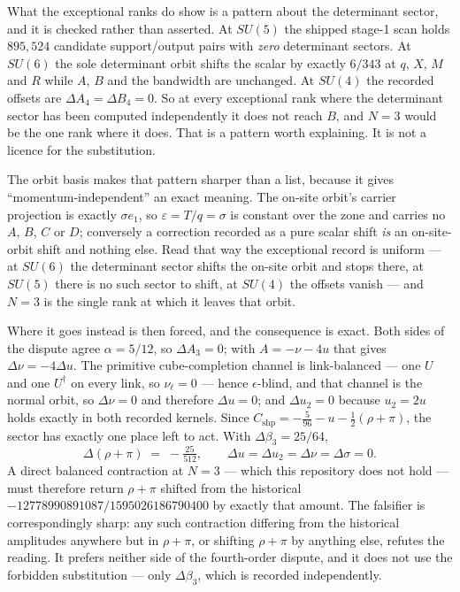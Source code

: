 \documentclass[11pt]{article}
\theoremstyle{plain}
\theoremstyle{definition}
\theoremstyle{remark}
\newcommand{\chk}[1]{}
\begin{document}
What the exceptional ranks do show is a pattern about the determinant sector,
and it is checked rather than asserted. At $SU(5)$ the shipped stage-1 scan
holds $895{,}524$ candidate support/output pairs with \emph{zero} determinant
sectors. At $SU(6)$ the sole determinant orbit shifts the scalar by exactly
$6/343$ at $q$, $X$, $M$ and $R$ while $A$, $B$ and the bandwidth are
unchanged. At $SU(4)$ the recorded offsets are $\Delta A_4=\Delta B_4=0$. So at
every exceptional rank where the determinant sector has been computed
independently it does not reach $B$, and $N=3$ would be the one rank where it
does. That is a pattern worth explaining. It is not a licence for the
substitution.
\chk{the SU(5) stage-1 scan is shipped: 895,524 pairs, zero determinant sectors}
\chk{the SU(6) determinant correction is exactly 6/343 and momentum-independent}
\chk{the N=3 continuation shift is exactly 25/64, with two exact corollaries}

The orbit basis makes that pattern sharper than a list, because it gives
``momentum-independent'' an exact meaning. The on-site orbit's carrier
projection is exactly $\sigma e_1$, so $\varepsilon = T/q = \sigma$ is constant
over the zone and carries no $A$, $B$, $C$ or $D$; conversely a correction
recorded as a pure scalar shift \emph{is} an on-site-orbit shift and nothing
else. Read that way the exceptional record is uniform --- at $SU(6)$ the
determinant sector shifts the on-site orbit and stops there, at $SU(5)$ there is
no such sector to shift, at $SU(4)$ the offsets vanish --- and $N=3$ is the
single rank at which it leaves that orbit.
\chk{the on-site orbit IS the momentum-independent channel}

Where it goes instead is then forced, and the consequence is exact. Both sides
of the dispute agree $\alpha=5/12$, so $\Delta A_3=0$; with $A=-\nu-4u$ that
gives $\Delta\nu=-4\Delta u$. The primitive cube-completion channel is
link-balanced --- one $U$ and one $U^\dagger$ on every link, so $\nu_\ell=0$ ---
hence $\epsilon$-blind, and that channel is the normal orbit, so $\Delta\nu=0$
and therefore $\Delta u=0$; and $\Delta u_2=0$ because $u_2=2u$ holds exactly in
both recorded kernels. Since
$C_{\mathrm{shp}}=-\tfrac{5}{96}-u-\tfrac12(\rho+\pi)$, the sector has exactly
one place left to act. With $\Delta\beta_3=25/64$,
\[
  \Delta(\rho+\pi)\;=\;-\tfrac{25}{512},
  \qquad \Delta u=\Delta u_2=\Delta\nu=\Delta\sigma=0 .
\]
A direct balanced contraction at $N=3$ --- which this repository does not hold
--- must therefore return $\rho+\pi$ shifted from the historical
$-12778990891087/1595026186790400$ by exactly that amount. The falsifier is
correspondingly sharp: any such contraction differing from the historical
amplitudes anywhere but in $\rho+\pi$, or shifting $\rho+\pi$ by anything else,
refutes the reading. It prefers neither side of the fourth-order dispute, and it
does not use the forbidden substitution --- only $\Delta\beta_3$, which is
recorded independently.
\chk{CORRECTED PREDICTION: the eps-sector at N=3 is Delta(rho + pi~) = -25/512; u is NOT constrained}
\end{document}
